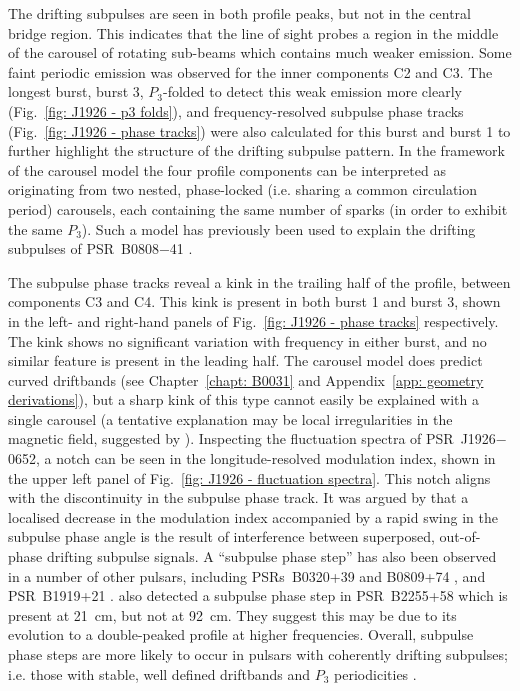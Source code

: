 The drifting subpulses are seen in both profile peaks, but not in the central bridge region. This indicates that the line of sight probes a region in the middle of the carousel of rotating sub-beams which contains much weaker emission. Some faint periodic emission was observed for the inner components C2 and C3. The longest burst, burst 3, $P_3$-folded to detect this weak emission more clearly (Fig.~\ref{fig: J1926 - p3 folds}), and frequency-resolved subpulse phase tracks (Fig.~\ref{fig: J1926 - phase tracks}) were also calculated for this burst and burst 1 to further highlight the structure of the drifting subpulse pattern. In the framework of the carousel model the four profile components can be interpreted as originating from two nested, phase-locked (i.e. sharing a common circulation period) carousels, each containing the same number of sparks (in order to exhibit the same $P_3$). Such a model has previously been used to explain the drifting subpulses of PSR~B0808$-$41 \citep{BBGx2009}.  

The subpulse phase tracks reveal a kink in the trailing half of the profile, between components C3 and C4. This kink is present in both burst 1 and burst 3, shown in the left- and right-hand panels of Fig.~\ref{fig: J1926 - phase tracks} respectively. The kink shows no significant variation with frequency in either burst, and no similar feature is present in the leading half. The carousel model does predict curved driftbands (see Chapter~\ref{chapt: B0031} and Appendix~\ref{app: geometry derivations}), but a sharp kink of this type cannot easily be explained with a single carousel (a tentative explanation may be local irregularities in the magnetic field, suggested by \citealt{WBSx1981}).  Inspecting the fluctuation spectra of PSR~J1926$-$0652, a notch can be seen in the longitude-resolved modulation index, shown in the upper left panel of Fig.~\ref{fig: J1926 - fluctuation spectra}. This notch aligns with the discontinuity in the subpulse phase track.
It was argued by \citet{ESLx2003} that a localised decrease in the modulation index accompanied by a rapid swing in the subpulse phase angle is the result of interference between superposed, out-of-phase drifting subpulse signals. A ``subpulse phase step'' has also been observed in a number of other pulsars, including PSRs~B0320+39 and B0809+74 \citep{ESLx2003,ESxx2003b}, and PSR~B1919+21 \citep{PWxx1986,WSEx2007}. \citet{WSEx2007} also detected a subpulse phase step in PSR~B2255+58 which is present at 21~cm, but not at 92~cm. They suggest this may be due to its evolution to a double-peaked profile at higher frequencies. Overall, subpulse phase steps are more likely to occur in pulsars with coherently drifting subpulses; i.e. those with stable, well defined driftbands and $P_3$ periodicities \citep{Wxxx2007,WSEx2007}.

